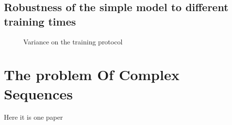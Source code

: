 \documentclass[10pt,a4paper]{article}
\begin{document}
\subsection{Robustness of the simple model to different training times}
\begin{figure}[H]
    \centering
    \qquad
    \caption{Variance on the training protocol}
	\label{fig:training_time_robustness}
\end{figure}

\section{The problem Of Complex Sequences}
Here it is one paper \cite{guyon1988storage}



\end{document}
